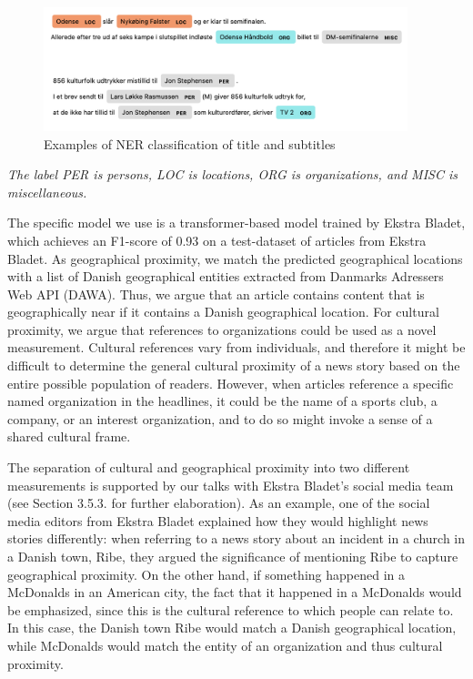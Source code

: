 \documentclass[
]{article}
\begin{document}
\begin{figure}[H]

{\centering \includegraphics[width=400px]{images/ner_examples} 

}

\caption{Examples of NER classification of title and subtitles}\label{fig:ner_example}
\end{figure}

\begin{center}
{\footnotesize \emph{The label PER is persons, LOC is locations, ORG is organizations, and MISC is miscellaneous.}}
\end{center}

\noindent The specific model we use is a transformer-based model trained
by Ekstra Bladet, which achieves an F1-score of 0.93 on a test-dataset
of articles from Ekstra Bladet. As geographical proximity, we match the
predicted geographical locations with a list of Danish geographical
entities extracted from Danmarks Adressers Web API (DAWA). Thus, we
argue that an article contains content that is geographically near if it
contains a Danish geographical location. For cultural proximity, we
argue that references to organizations could be used as a novel
measurement. Cultural references vary from individuals, and therefore it
might be difficult to determine the general cultural proximity of a news
story based on the entire possible population of readers. However, when
articles reference a specific named organization in the headlines, it
could be the name of a sports club, a company, or an interest
organization, and to do so might invoke a sense of a shared cultural
frame.

The separation of cultural and geographical proximity into two different
measurements is supported by our talks with Ekstra Bladet's social media
team (see Section 3.5.3. for further elaboration). As an example, one of
the social media editors from Ekstra Bladet explained how they would
highlight news stories differently: when referring to a news story about
an incident in a church in a Danish town, Ribe, they argued the
significance of mentioning Ribe to capture geographical proximity. On
the other hand, if something happened in a McDonalds in an American
city, the fact that it happened in a McDonalds would be emphasized,
since this is the cultural reference to which people can relate to. In
this case, the Danish town Ribe would match a Danish geographical
location, while McDonalds would match the entity of an organization and
thus cultural proximity.
\end{document}
